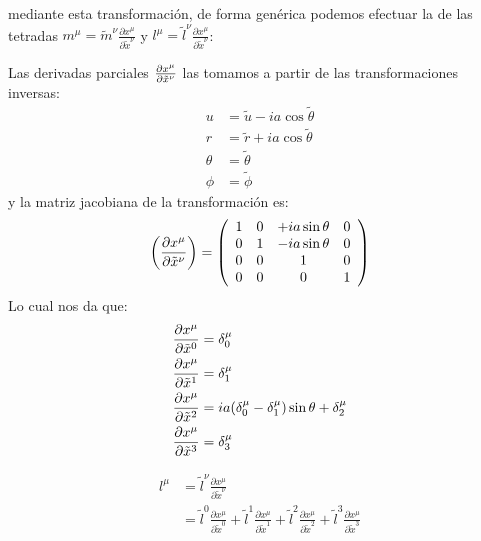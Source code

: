 \begin{enumerate}[1.]
          mediante esta transformación, de forma genérica podemos efectuar la de las tetradas $m^\mu = \tilde{m}^\nu \frac{\partial x^\mu}{\partial \tilde{x}^\nu}$ y $l^\mu = \tilde{l}^\nu \frac{\partial x^\mu}{\partial \tilde{x}^\nu}$:
          \begin{note}
            Las derivadas parciales $\frac{\partial x^\mu}{\partial \tilde{x}^\nu}$ las tomamos a partir de las transformaciones inversas:
            $$\begin{aligned} u & =\tilde{u}-i a \cos \tilde{\theta} \\ r & =\tilde{r}+i a \cos \tilde{\theta} \\ \theta & =\tilde{\theta} \\ \phi & =\tilde{\phi}\end{aligned}$$
            y la matriz jacobiana de la transformación es:
            \begin{equation}
               \left(\frac{\partial x^\mu}{\partial \tilde{x}^\nu}\right) =\left(\begin{array}{cccc}
                1 & 0 & +i a \sin \theta & 0\\
                0 & 1 & -i a \sin \theta & 0\\
                0 & 0 & 1 & 0\\
                0 & 0 & 0& 1
                \end{array}\right)
                \end{equation}
                Lo cual nos da que:
                \begin{align*}
                \frac{\partial x^\mu}{\partial \tilde{x}^0}&= \delta^\mu_0\\
                \frac{\partial x^\mu}{\partial \tilde{x}^1}&= \delta^\mu_1\\
                \frac{\partial x^\mu}{\partial \tilde{x}^2}&= ia (\delta^\mu_0 - \delta^\mu_1)\sin \theta + \delta^\mu_2\\
                \frac{\partial x^\mu}{\partial \tilde{x}^3}&=\delta^\mu_3
                \end{align*}
          \end{note}
          \begin{equation}
              \begin{aligned}
                  l^\mu & = \tilde{l}^\nu \frac{\partial x^\mu}{\partial \tilde{x}^\nu}                                                                                                                                                                           \\
                        & = \tilde{l}^0 \frac{\partial x^\mu}{\partial \tilde{x}^0} + \tilde{l}^1 \frac{\partial x^\mu}{\partial \tilde{x}^1} + \tilde{l}^2 \frac{\partial x^\mu}{\partial \tilde{x}^2} + \tilde{l}^3 \frac{\partial x^\mu}{\partial \tilde{x}^3} \\

\end{aligned}
\end{equation}
\end{enumerate}
